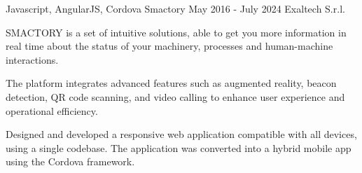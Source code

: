\begin{cventries}
  \cventry
    {Javascript, AngularJS, Cordova} %
    {Smactory} %
    {May 2016 - July 2024} %
    {Exaltech S.r.l.} %
    {
      \begin{cvitems} %
        \item {SMACTORY is a set of intuitive solutions, able to get you more information in real time about the status of your machinery, processes and human-machine interactions.}
        \item {The platform integrates advanced features such as augmented reality, beacon detection, QR code scanning, and video calling to enhance user experience and operational efficiency.}  
        \item {Designed and developed a responsive web application compatible with all devices, using a single codebase. The application was converted into a hybrid mobile app using the Cordova framework.}  
      \end{cvitems}
    }
\end{cventries}
